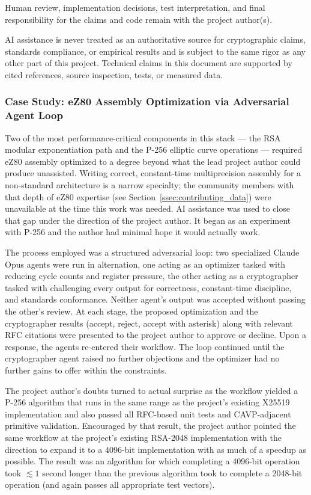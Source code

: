\documentclass[titlepage]{report}
\begin{document}
	Human review, implementation decisions, test interpretation, and final responsibility for the claims and code remain with the project author(s).

	AI assistance is never treated as an authoritative source for cryptographic claims, standards compliance, or empirical results and is subject to the same rigor as any other part of this project. Technical claims in this document are supported by cited references, source inspection, tests, or measured data.

	\subsubsection{Case Study: eZ80 Assembly Optimization via Adversarial Agent Loop}

	Two of the most performance-critical components in this stack --- the RSA modular exponentiation path and the P-256 elliptic curve operations --- required eZ80 assembly optimized to a degree beyond what the lead project author could produce unassisted. Writing correct, constant-time multiprecision assembly for a non-standard architecture is a narrow specialty; the community members with that depth of eZ80 expertise (see Section~\ref{ssec:contributing_data}) were unavailable at the time this work was needed. AI assistance was used to close that gap under the direction of the project author. It began as an experiment with P-256 and the author had minimal hope it would actually work.

	The process employed was a structured adversarial loop: two specialized Claude Opus agents were run in alternation, one acting as an optimizer tasked with reducing cycle counts and register pressure, the other acting as a cryptographer tasked with challenging every output for correctness, constant-time discipline, and standards conformance. Neither agent's output was accepted without passing the other's review. At each stage, the proposed optimization and the cryptographer results (accept, reject, accept with asterisk) along with relevant RFC citations were presented to the project author to approve or decline. Upon a response, the agents re-entered their workflow. The loop continued until the cryptographer agent raised no further objections and the optimizer had no further gains to offer within the constraints.

	The project author's doubts turned to actual surprise as the workflow yielded a P-256 algorithm that runs in the same range as the project's existing X25519 implementation and also passed all RFC-based unit tests and CAVP-adjacent primitive validation. Encouraged by that result, the project author pointed the same workflow at the project's existing RSA-2048 implementation with the direction to expand it to a 4096-bit implementation with as much of a speedup as possible. The result was an algorithm for which completing a 4096-bit operation took $\lesssim 1$ second longer than the previous algorithm took to complete a 2048-bit operation (and again passes all appropriate test vectors). 
	
\end{document}
